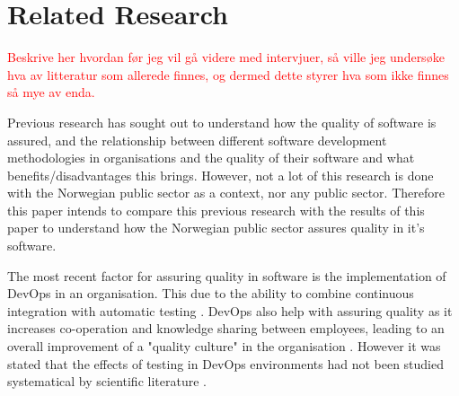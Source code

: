 \chapter{Related Research} \label{sec:related_research}

\textcolor{red}{Beskrive her hvordan før jeg vil gå videre med intervjuer, så ville jeg undersøke hva av litteratur som allerede finnes, og dermed dette styrer hva som ikke finnes så mye av enda.}

Previous research has sought out to understand how the quality of software is assured, and the relationship between different software development methodologies in organisations and the quality of their software and what benefits/disadvantages this brings. However, not a lot of this research is done with the Norwegian public sector as a context, nor any public sector. Therefore this paper intends to compare this previous research with the results of this paper to understand how the Norwegian public sector assures quality in it's software. 


The most recent factor for assuring quality in software is the implementation of DevOps in an organisation. This due to the ability to combine continuous integration with automatic testing \cite{am_2020}\cite{smm_2018}\cite{ml_2022}. DevOps also help with assuring quality as it increases co-operation and knowledge sharing between employees, leading to an overall improvement of a "quality culture" in the organisation \cite{smm_2018}\cite{mm_2021}. However it was stated that the effects of testing in DevOps environments had not been studied systematical by scientific literature \cite{dsc_2019}\cite{ja_2016}.

